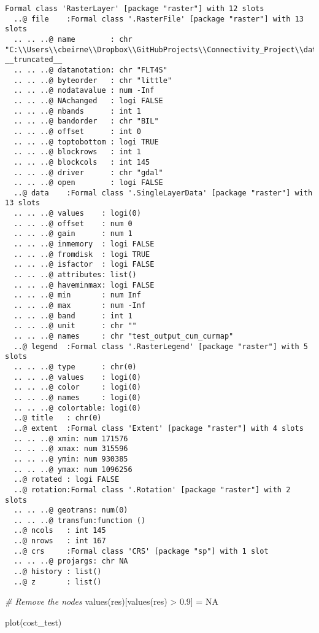\documentclass[
]{book}
\newenvironment{Shaded}{\begin{snugshade}}{\end{snugshade}}
\newcommand{\CommentTok}[1]{\textcolor[rgb]{0.56,0.35,0.01}{\textit{#1}}}
\newcommand{\ConstantTok}[1]{\textcolor[rgb]{0.00,0.00,0.00}{#1}}
\newcommand{\FloatTok}[1]{\textcolor[rgb]{0.00,0.00,0.81}{#1}}
\newcommand{\FunctionTok}[1]{\textcolor[rgb]{0.00,0.00,0.00}{#1}}
\newcommand{\NormalTok}[1]{#1}
\newcommand{\OtherTok}[1]{\textcolor[rgb]{0.56,0.35,0.01}{#1}}
\newcommand{\SpecialCharTok}[1]{\textcolor[rgb]{0.00,0.00,0.00}{#1}}
\begin{document}
\begin{verbatim}
Formal class 'RasterLayer' [package "raster"] with 12 slots
  ..@ file    :Formal class '.RasterFile' [package "raster"] with 13 slots
  .. .. ..@ name        : chr "C:\\Users\\cbeirne\\Dropbox\\GitHubProjects\\Connectivity_Project\\data\\Chapter6\\test1_files\\Circuitscape_ou"| __truncated__
  .. .. ..@ datanotation: chr "FLT4S"
  .. .. ..@ byteorder   : chr "little"
  .. .. ..@ nodatavalue : num -Inf
  .. .. ..@ NAchanged   : logi FALSE
  .. .. ..@ nbands      : int 1
  .. .. ..@ bandorder   : chr "BIL"
  .. .. ..@ offset      : int 0
  .. .. ..@ toptobottom : logi TRUE
  .. .. ..@ blockrows   : int 1
  .. .. ..@ blockcols   : int 145
  .. .. ..@ driver      : chr "gdal"
  .. .. ..@ open        : logi FALSE
  ..@ data    :Formal class '.SingleLayerData' [package "raster"] with 13 slots
  .. .. ..@ values    : logi(0) 
  .. .. ..@ offset    : num 0
  .. .. ..@ gain      : num 1
  .. .. ..@ inmemory  : logi FALSE
  .. .. ..@ fromdisk  : logi TRUE
  .. .. ..@ isfactor  : logi FALSE
  .. .. ..@ attributes: list()
  .. .. ..@ haveminmax: logi FALSE
  .. .. ..@ min       : num Inf
  .. .. ..@ max       : num -Inf
  .. .. ..@ band      : int 1
  .. .. ..@ unit      : chr ""
  .. .. ..@ names     : chr "test_output_cum_curmap"
  ..@ legend  :Formal class '.RasterLegend' [package "raster"] with 5 slots
  .. .. ..@ type      : chr(0) 
  .. .. ..@ values    : logi(0) 
  .. .. ..@ color     : logi(0) 
  .. .. ..@ names     : logi(0) 
  .. .. ..@ colortable: logi(0) 
  ..@ title   : chr(0) 
  ..@ extent  :Formal class 'Extent' [package "raster"] with 4 slots
  .. .. ..@ xmin: num 171576
  .. .. ..@ xmax: num 315596
  .. .. ..@ ymin: num 930385
  .. .. ..@ ymax: num 1096256
  ..@ rotated : logi FALSE
  ..@ rotation:Formal class '.Rotation' [package "raster"] with 2 slots
  .. .. ..@ geotrans: num(0) 
  .. .. ..@ transfun:function ()  
  ..@ ncols   : int 145
  ..@ nrows   : int 167
  ..@ crs     :Formal class 'CRS' [package "sp"] with 1 slot
  .. .. ..@ projargs: chr NA
  ..@ history : list()
  ..@ z       : list()
\end{verbatim}

\begin{Shaded}
\begin{Highlighting}[]
\CommentTok{\# Remove the nodes}
\FunctionTok{values}\NormalTok{(res)[}\FunctionTok{values}\NormalTok{(res) }\SpecialCharTok{\textgreater{}} \FloatTok{0.9}\NormalTok{] }\OtherTok{=} \ConstantTok{NA}

\FunctionTok{plot}\NormalTok{(cost\_test)  }
\end{Highlighting}
\end{Shaded}
\end{document}
